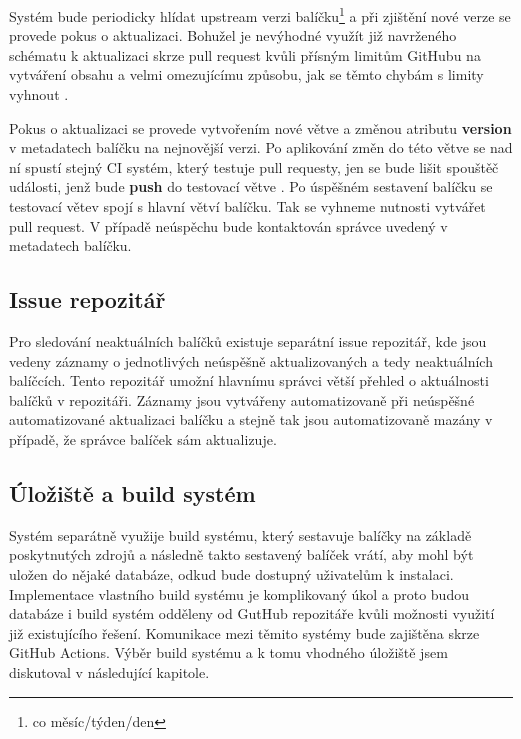 \documentclass[
  digital,     %
  oneside,     %
  nosansbold,  %
  nocolorbold, %
  lof,         %
  lot,         %
]{fithesis4}
\begin{document}
Systém bude periodicky hlídat upstream verzi balíčku\footnote{co měsíc/týden/den} 
a při zjištění nové verze se provede pokus o aktualizaci. Bohužel je nevýhodné
využít již navrženého schématu k aktualizaci skrze pull request kvůli
přísným limitům GitHubu na vytváření obsahu \cite{gh_secondary_rate_limits}
a velmi omezujícímu způsobu, jak se těmto chybám s limity vyhnout
\cite{gh_avoid_secondary_rate_limits}.

Pokus o aktualizaci se provede vytvořením nové větve a změnou atributu
\textbf{version} v metadatech balíčku na nejnovější verzi. Po aplikování
změn do této větve se nad ní spustí stejný CI systém, který testuje pull
requesty, jen se bude lišit spouštěč události, jenž bude \textbf{push} do
testovací větve \cite{gh_push_trigger}. Po úspěšném sestavení balíčku se 
testovací větev spojí s hlavní větví balíčku. Tak se vyhneme nutnosti vytvářet 
pull request. V případě neúspěchu bude kontaktován správce uvedený v metadatech
balíčku.


\subsection{Issue repozitář}

Pro sledování neaktuálních balíčků existuje separátní issue repozitář, kde
jsou vedeny záznamy o jednotlivých neúspěšně aktualizovaných a tedy neaktuálních
balíčcích. Tento repozitář umožní hlavnímu správci větší přehled o aktuálnosti
balíčků v repozitáři. Záznamy jsou vytvářeny automatizovaně při neúspěšné automatizované
aktualizaci balíčku a stejně tak jsou automatizovaně mazány v případě, že správce
balíček sám aktualizuje.


\subsection{Úložiště a build systém}

Systém separátně využije build systému, který sestavuje balíčky na základě
poskytnutých zdrojů a následně takto sestavený balíček vrátí, aby mohl být
uložen do nějaké databáze, odkud bude dostupný uživatelům k instalaci.
Implementace vlastního build systému je komplikovaný úkol a proto budou
databáze i build systém odděleny od GutHub repozitáře kvůli možnosti
využití již existujícího řešení. Komunikace mezi těmito systémy bude
zajištěna skrze GitHub Actions. Výběr build systému a k tomu vhodného
úložiště jsem diskutoval v následující kapitole.


\end{document}
